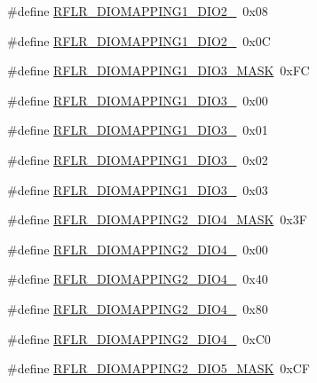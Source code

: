 \begin{DoxyCompactItemize}
\item 
\#define \hyperlink{sx1276Regs-LoRa_8h_a9b1a690269c769c7a7eec3b20238868a}{R\+F\+L\+R\+\_\+\+D\+I\+O\+M\+A\+P\+P\+I\+N\+G1\+\_\+\+D\+I\+O2\+\_}~0x08
\item 
\#define \hyperlink{sx1276Regs-LoRa_8h_a2c4eeeb8117d63b3e7caf7c7d664aad0}{R\+F\+L\+R\+\_\+\+D\+I\+O\+M\+A\+P\+P\+I\+N\+G1\+\_\+\+D\+I\+O2\+\_}~0x0C
\item 
\#define \hyperlink{sx1276Regs-LoRa_8h_a671275ba8790f890b2cab8745c0e5da9}{R\+F\+L\+R\+\_\+\+D\+I\+O\+M\+A\+P\+P\+I\+N\+G1\+\_\+\+D\+I\+O3\+\_\+\+M\+A\+SK}~0x\+FC
\item 
\#define \hyperlink{sx1276Regs-LoRa_8h_a551ae1e5f5fca17d8b1866ef33d8c625}{R\+F\+L\+R\+\_\+\+D\+I\+O\+M\+A\+P\+P\+I\+N\+G1\+\_\+\+D\+I\+O3\+\_}~0x00
\item 
\#define \hyperlink{sx1276Regs-LoRa_8h_a2017ab5d8218e6ec01f7bc8c530dab36}{R\+F\+L\+R\+\_\+\+D\+I\+O\+M\+A\+P\+P\+I\+N\+G1\+\_\+\+D\+I\+O3\+\_}~0x01
\item 
\#define \hyperlink{sx1276Regs-LoRa_8h_ad8f51698cfb8f6f58a6f29735d27807b}{R\+F\+L\+R\+\_\+\+D\+I\+O\+M\+A\+P\+P\+I\+N\+G1\+\_\+\+D\+I\+O3\+\_}~0x02
\item 
\#define \hyperlink{sx1276Regs-LoRa_8h_abfb68e4b1ca125be4fa873f9bc2a4a35}{R\+F\+L\+R\+\_\+\+D\+I\+O\+M\+A\+P\+P\+I\+N\+G1\+\_\+\+D\+I\+O3\+\_}~0x03
\item 
\#define \hyperlink{sx1276Regs-LoRa_8h_a2edc9ee9a9806b51ce98036d53023a1b}{R\+F\+L\+R\+\_\+\+D\+I\+O\+M\+A\+P\+P\+I\+N\+G2\+\_\+\+D\+I\+O4\+\_\+\+M\+A\+SK}~0x3F
\item 
\#define \hyperlink{sx1276Regs-LoRa_8h_a4411dcaba5455b537f266a64720f27ed}{R\+F\+L\+R\+\_\+\+D\+I\+O\+M\+A\+P\+P\+I\+N\+G2\+\_\+\+D\+I\+O4\+\_}~0x00
\item 
\#define \hyperlink{sx1276Regs-LoRa_8h_a1bd8087999e9680a935e194cc38d0059}{R\+F\+L\+R\+\_\+\+D\+I\+O\+M\+A\+P\+P\+I\+N\+G2\+\_\+\+D\+I\+O4\+\_}~0x40
\item 
\#define \hyperlink{sx1276Regs-LoRa_8h_a236e237046e0ad2df6fc1863faf889e8}{R\+F\+L\+R\+\_\+\+D\+I\+O\+M\+A\+P\+P\+I\+N\+G2\+\_\+\+D\+I\+O4\+\_}~0x80
\item 
\#define \hyperlink{sx1276Regs-LoRa_8h_a34a1f33c5dc2b5ccfbb23eb88449e0c4}{R\+F\+L\+R\+\_\+\+D\+I\+O\+M\+A\+P\+P\+I\+N\+G2\+\_\+\+D\+I\+O4\+\_}~0x\+C0
\item 
\#define \hyperlink{sx1276Regs-LoRa_8h_af3fc23f7884695edc293589fd947e129}{R\+F\+L\+R\+\_\+\+D\+I\+O\+M\+A\+P\+P\+I\+N\+G2\+\_\+\+D\+I\+O5\+\_\+\+M\+A\+SK}~0x\+CF

\end{DoxyCompactItemize}
